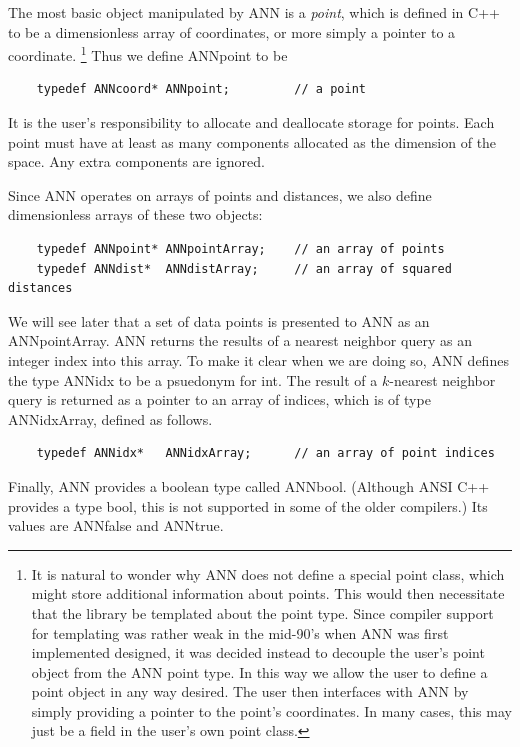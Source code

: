 \documentclass[11pt]{article}		%
\newcommand{\ANN}[0]{\textsf{ANN}}
\begin{document}
The most basic object manipulated by {\ANN} is a \emph{point}, which is
defined in C++ to be a dimensionless array of coordinates, or more
simply a pointer to a coordinate.%
%
\footnote{It is natural to wonder why {\ANN} does not define a special
point class, which might store additional information about points.
This would then necessitate that the library be templated about the
point type.  Since compiler support for templating was rather weak in
the mid-90's when {\ANN} was first implemented designed, it was decided
instead to decouple the user's point object from the {\ANN} point type.
In this way we allow the user to define a point object in any way
desired.  The user then interfaces with {\ANN} by simply providing a
pointer to the point's coordinates.  In many cases, this may just be a
field in the user's own point class.}
%
Thus we define \textsf{ANNpoint} to be
{\small \begin{verbatim}
    typedef ANNcoord* ANNpoint;         // a point
\end{verbatim} }
It is the user's responsibility to allocate and deallocate storage
for points.  Each point must have at least as many components allocated
as the dimension of the space.  Any extra components are ignored.

Since {\ANN} operates on arrays of points and distances, we also define
dimensionless arrays of these two objects:
%
{\small \begin{verbatim}
    typedef ANNpoint* ANNpointArray;    // an array of points
    typedef ANNdist*  ANNdistArray;     // an array of squared distances
\end{verbatim} }

We will see later that a set of data points is presented to {\ANN} as an
\textsf{ANNpointArray}.  {\ANN} returns the results of a nearest
neighbor query as an integer index into this array.  To make it clear
when we are doing so, {\ANN} defines the type \textsf{ANNidx} to be a
psuedonym for \textsf{int}.  The result of a $k$-nearest neighbor query
is returned as a pointer to an array of indices, which is of type
\textsf{ANNidxArray}, defined as follows.
%
{\small \begin{verbatim}
    typedef ANNidx*   ANNidxArray;      // an array of point indices
\end{verbatim} }

Finally, {\ANN} provides a boolean type called \textsf{ANNbool}.
(Although ANSI C++ provides a type \textsf{bool}, this is not supported
in some of the older compilers.)  Its values are \textsf{ANNfalse} and
\textsf{ANNtrue}.
\end{document}
